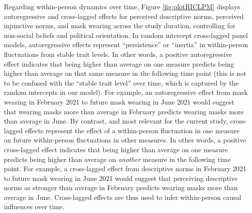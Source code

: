 \documentclass[
  man, donotrepeattitle,mask,floatsintext]{apa6}
\begin{document}
Regarding within-person dynamics over time, Figure \ref{fig:plotRICLPM} displays autoregressive and cross-lagged effects for perceived descriptive norms, perceived injunctive norms, and mask wearing across the study duration, controlling for non-social beliefs and political orientation. In random intercept cross-lagged panel models, autoregressive effects represent ``persistence'' or ``inertia'' in within-person fluctuations from stable trait levels. In other words, a positive autoregressive effect indicates that being higher than average on one measure predicts being higher than average on that same measure in the following time point (this is not to be confused with the ``stable trait level'' over time, which is captured by the random intercepts in our model). For example, an autoregressive effect from mask wearing in February 2021 to future mask wearing in June 2021 would suggest that wearing masks more than average in February predicts wearing masks more than average in June. By contrast, and most relevant for the current study, cross-lagged effects represent the effect of a within-person fluctuation in one measure on future within-person fluctuations in other measures. In other words, a positive cross-lagged effect indicates that being higher than average on one measure predicts being higher than average on \emph{another} measure in the following time point. For example, a cross-lagged effect from descriptive norms in February 2021 to future mask wearing in June 2021 would suggest that perceiving descriptive norms as stronger than average in February predicts wearing masks more than average in June. Cross-lagged effects are thus used to infer within-person causal influences over time.
\end{document}
